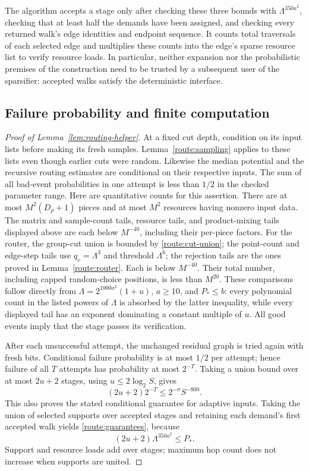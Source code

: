 The algorithm accepts a stage only after checking these three
bounds with $\Lambda^{350a^2}$, checking that at least half the
demands have been assigned, and checking every returned walk's
edge identities and endpoint sequence.  It counts total
traversals of each selected edge and multiplies these counts into
the edge's sparse resource list to verify resource loads.  In
particular, neither expansion nor the probabilistic premises of
the construction need to be trusted by a subsequent user of the
sparsifier: accepted walks satisfy the deterministic interface.

\subsection{Failure probability and finite computation}

\begin{proof}[Proof of Lemma~\ref{lem:routing-helper}]
At a fixed cut depth, condition on its input lists before making
its fresh samples.  Lemma~\ref{route:sampling} applies to these
lists even though earlier cuts were random.  Likewise the median
potential and the recursive routing estimates are conditional on
their respective inputs.  The sum of all bad-event probabilities
in one attempt is less than $1/2$ in the checked parameter range.
Here are quantitative counts for this assertion.  There are at
most $M^2(D_p+1)$ pieces and at most $M^2$ resources having nonzero
input data.  The matrix and sample-count tails, resource tails,
and product-mixing tails displayed above are each below $M^{-40}$,
including their per-piece factors.  For the router, the group-cut
union is bounded by \eqref{route:cut-union}; the point-count and
edge-step tails use $q_v=\Lambda^3$ and threshold $\Lambda^6$;
the rejection tails are the ones proved in
Lemma~\ref{route:router}.  Each is below $M^{-40}$.  Their total
number, including capped random-choice positions, is less than
$M^{20}$.  These comparisons follow directly from
$\Lambda=2^{1000a^2}(1+u)$, $a\ge10$, and $P_*\le b$:
every polynomial count in the listed powers of $\Lambda$ is
absorbed by the latter inequality, while every displayed tail
has an exponent dominating a constant multiple of $u$.
All good events imply that the stage passes its verification.

After each unsuccessful attempt, the unchanged residual graph is
tried again with fresh bits.  Conditional failure probability is
at most $1/2$ per attempt; hence failure of all $T$ attempts has
probability at most $2^{-T}$.  Taking a union bound over at most
$2u+2$ stages, using $u\le2\log_2 S$, gives
\[
 (2u+2)2^{-T}\le2^{-\sigma}S^{-800}.
\]
This also proves the stated conditional guarantee for adaptive
inputs.  Taking the union of selected supports over accepted
stages and retaining each demand's first accepted walk yields
\eqref{route:guarantees}, because
\[
 (2u+2)\Lambda^{350a^2}\le P_*.
\]
Support and resource loads add over stages; maximum hop count
does not increase when supports are united.


\end{proof}
